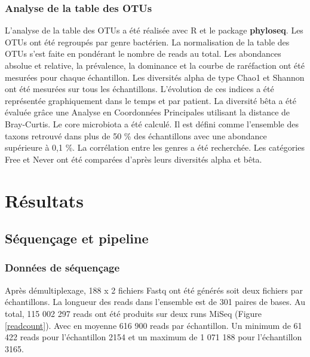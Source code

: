 \documentclass[12pt,a4paper]{article}
\begin{document}
\subsubsection{Analyse de la table des OTUs}
L’analyse de la table des OTUs a été réalisée avec R et le package \textbf{phyloseq}\cite{McMurdie2013}. Les OTUs ont été regroupés par genre bactérien. La normalisation de la table des OTUs s'est faite en pondérant le nombre de reads au total.
Les abondances absolue et relative, la prévalence, la dominance et la courbe de raréfaction ont été mesurées pour chaque échantillon.
Les diversités alpha de type Chao1 et Shannon ont été mesurées sur tous les échantillons. L'évolution de ces indices a été représentée graphiquement dans le temps et par patient.
La diversité bêta a été évaluée grâce une Analyse en Coordonnées Principales utilisant la distance de Bray-Curtis.
Le core microbiota\cite{VanderGast2011} a été calculé. Il est défini comme l’ensemble des taxons retrouvé dans plus de 50 \% des échantillons avec une abondance supérieure à 0,1 \%.
La corrélation entre les genres a été recherchée.
Les catégories Free et Never ont été comparées d’après leurs diversités alpha et bêta.



\section{Résultats}
\subsection{Séquençage et pipeline}
\subsubsection{Données de séquençage}
Après démultiplexage, 188 x 2 fichiers Fastq ont été générés soit deux fichiers par échantillons.
La longueur des reads dans l'ensemble est de 301 paires de bases.
Au total, 115 002 297 reads ont été produits sur deux runs MiSeq (Figure \ref{readcount}). Avec en moyenne 616 900 reads par échantillon. Un minimum de 61 422 reads pour l’échantillon 2154 et un maximum de 1 071 188 pour l’échantillon 3165.
\end{document}
